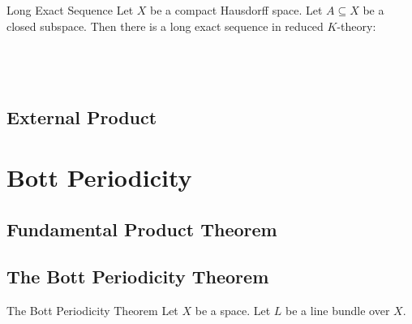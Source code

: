 \documentclass[a4paper]{article}
\begin{document}
\begin{thm}{Long Exact Sequence}{} Let $X$ be a compact Hausdorff space. Let $A\subseteq X$ be a closed subspace. Then there is a long exact sequence in reduced $K$-theory: \\~\\
\\~\\
\end{thm}

\subsection{External Product}

\pagebreak
\section{Bott Periodicity}
\subsection{Fundamental Product Theorem}
\subsection{The Bott Periodicity Theorem}
\begin{thm}{The Bott Periodicity Theorem}{} Let $X$ be a space. Let $L$ be a line bundle over $X$. 
\end{thm}
\end{document}

